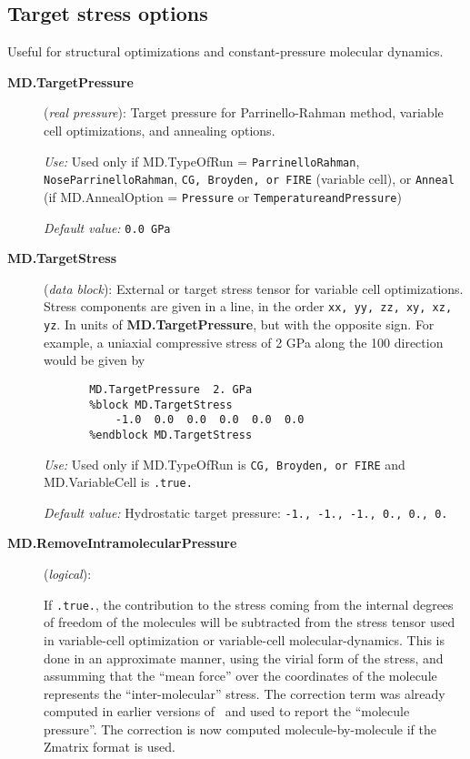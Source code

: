 \subsection{Target stress options}

Useful for structural optimizations and constant-pressure molecular
dynamics.

\begin{description}


\item[\textbf{MD.TargetPressure}] (\textit{real pressure}):
Target pressure for Parrinello-Rahman method, variable cell optimizations,
and annealing options.

\textit{Use:} Used only if MD.TypeOfRun =
\texttt{ParrinelloRahman}, \texttt{NoseParrinelloRahman},
\texttt{CG, Broyden, or FIRE} (variable cell), or \texttt{Anneal}
(if MD.AnnealOption = \texttt{Pressure} or \texttt{TemperatureandPressure})

\textit{Default value:} \texttt{0.0 GPa}


\item[\textbf{MD.TargetStress}] (\textit{data block}): External or
target stress tensor for variable cell optimizations.  Stress
components are given in a line, in the order \texttt{xx, yy, zz, xy,
        xz, yz}. In units of \textbf{MD.TargetPressure}, but with the
    opposite sign. For example, a uniaxial compressive stress of 2 GPa
    along the 100 direction would be given by
\begin{verbatim}
       MD.TargetPressure  2. GPa
       %block MD.TargetStress
           -1.0  0.0  0.0  0.0  0.0  0.0
       %endblock MD.TargetStress
\end{verbatim}

\textit{Use:} Used only if MD.TypeOfRun is \texttt{CG, Broyden, or FIRE} and
MD.VariableCell is \texttt{.true.}

\textit{Default value:} Hydrostatic target pressure:
\texttt{-1., -1., -1., 0., 0., 0.}

\item[\textbf{MD.RemoveIntramolecularPressure}] (\textit{logical}):

If \texttt{.true.}, the contribution to the stress coming from the
internal degrees of freedom of the molecules will be subtracted from
the stress tensor used in variable-cell optimization or variable-cell
molecular-dynamics.  This is done in an approximate manner, using the
virial form of the stress, and assumming that the ``mean force'' over
the coordinates of the molecule represents the ``inter-molecular''
stress. The correction term was already computed in earlier versions
of \siesta\ and used to report the ``molecule pressure''. The
correction is now computed molecule-by-molecule if the Zmatrix format
is used.


\end{description}
